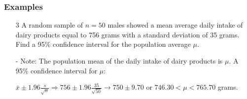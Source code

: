 \documentclass[12pt, letterpaper]{article}
\begin{document}
            \subsubsection*{Examples}
                \begin{itemize}
                    \item[3] A random sample of $n = 50$ males showed a mean average daily intake of dairy products equal to 756 grams with a standard deviation of 35 grams. Find a 95\% confidence interval for the population average $\mu$.
                    \item[-] Note: The population mean of the daily intake of dairy products is $\mu$. A 95\% confidence interval for $\mu$: 
                    \begin{mdframed}[leftmargin=0.5cm,rightmargin=0.5cm]
                        $\bar{x} \pm 1.96\frac{s}{\sqrt{n}} \Rightarrow  756 \pm 1.96\frac{35}{\sqrt{50}} \rightarrow 750\pm 9.70$ or $746.30 < \mu < 765.70$ grams.
                    \end{mdframed}
                \end{itemize}
\end{document}
